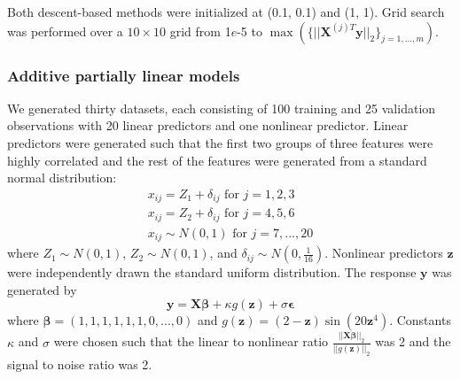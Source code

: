 \documentclass{statsoc}
\begin{document}
Both descent-based methods were initialized at (0.1, 0.1) and (1, 1). Grid search was performed over a $10 \times 10$ grid from 1$e$-5 to $\max(\{||\boldsymbol X^{(j)T} \boldsymbol y ||_2\}_{j=1,..., m})$.

\subsubsection{Additive partially linear models}\label{sec:simulation_aplm}
We generated thirty datasets, each consisting of 100 training and 25 validation observations with 20 linear predictors and one nonlinear predictor. Linear predictors were generated such that the first two groups of three features were highly correlated and the rest of the features were generated from a standard normal distribution:
\begin{equation}
\begin{array}{c}
x_{ij} = Z_1 + \delta_{ij} \text{ for } j=1, 2, 3 \\
x_{ij} = Z_2 + \delta_{ij} \text{ for } j= 4, 5, 6 \\
x_{ij} \sim N(0,1) \text{ for } j = 7, ..., 20
\end{array}
\end{equation}
where $Z_1 \sim N(0,1)$, $Z_2 \sim N(0,1)$, and $\delta_{ij} \sim N(0, \frac{1}{16})$. Nonlinear predictors $\boldsymbol z$ were independently drawn the standard uniform distribution. The response $\boldsymbol y$ was generated by
\begin{equation}
\boldsymbol y = \boldsymbol X \boldsymbol \beta + \kappa g(\boldsymbol z) + \sigma \boldsymbol \epsilon
\end{equation}
where $\boldsymbol \beta = (1, 1, 1, 1, 1, 1, 0, ..., 0)$ and $g(\boldsymbol z) =(2-\boldsymbol z)\sin(20 \boldsymbol z^4)$. Constants $\kappa$ and $\sigma$ were chosen such that the linear to nonlinear ratio $\frac{||\boldsymbol X \boldsymbol \beta||_2}{||g(\boldsymbol z)||_2}$ was 2 and the signal to noise ratio was 2. 
\end{document}
